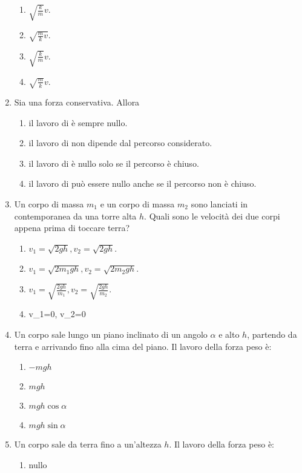 \documentclass{article}
\begin{document}
\begin{enumerate}
  \begin{enumerate}[label=\Alph*.]
    \item $\sqrt{\frac{k}{m}}v$.
    \item $\sqrt{\frac{m}{k}v}$.
    \item $\sqrt{\frac{k}{m}}v$.
    \item $\sqrt{\frac{m}{k}}v$.
  \end{enumerate}
  \item Sia  una forza conservativa. Allora
  \begin{enumerate}[label=\Alph*.]
    \item il lavoro di  è sempre nullo.
    \item il lavoro di  non dipende dal percorso considerato.
    \item il lavoro di  è nullo solo se il percorso è chiuso.
    \item il lavoro di  può essere nullo anche se il percorso non è chiuso.
  \end{enumerate}
  \item Un corpo di massa $m_1$ e un corpo di massa $m_2$ sono lanciati in contemporanea da una torre alta $h$. Quali sono le velocità dei due corpi appena prima di toccare terra?
  \begin{enumerate}[label=\Alph*.]
    \item $v_1=\sqrt{2gh}, v_2=\sqrt{2gh}$.
    \item $v_1=\sqrt{2m_1gh}, v_2=\sqrt{2m_2gh}$.
    \item $v_1=\sqrt{\frac{2gh}{m_1}}, v_2=\sqrt{\frac{2gh}{m_2}}$.
    \item v_1=0, v_2=0
  \end{enumerate}
  \item Un corpo sale lungo un piano inclinato di un angolo $\alpha$ e alto $h$, partendo da terra e arrivando fino alla cima del piano. Il lavoro della forza peso è:
  \begin{enumerate}[label=\Alph*.]
    \item $-mgh$
    \item $mgh$
    \item $mgh\cos\alpha$
    \item $mgh\sin\alpha$
  \end{enumerate}
  \item Un corpo sale da terra fino a un'altezza $h$. Il lavoro della forza peso è:
  \begin{enumerate}[label=\Alph*.]
    \item nullo

\end{enumerate}
\end{enumerate}
\end{document}
